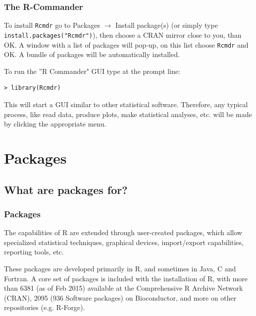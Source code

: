 \documentclass[xcolor={table},c]{beamer}
\begin{document}
\begin{frame}[fragile]\frametitle{The R-Commander}
To install \texttt{Rcmdr}  go to Packages $\rightarrow$ Install package(s) (or simply type \verb|install.packages("Rcmdr")|), then choose a CRAN mirror close to you, than OK. A window with a list of packages will pop-up, on this list choose \texttt{Rcmdr} and OK. A bundle of packages will be automatically installed.

To run the ''R Commander" GUI type at the prompt line:
\begin{verbatim}
> library(Rcmdr)
\end{verbatim}
This will start a GUI similar to other statistical software. Therefore, any typical process, like read data, produce plots, make statistical analyses, etc. will be made by clicking the appropriate menu.
\end{frame}

\section{Packages}
\subsection{What are packages for?}

\begin{frame}[shrink=5]\frametitle{Packages}
  The capabilities of R are extended through user-created packages, which allow specialized statistical techniques, graphical devices, import/export capabilities, reporting tools, etc. \newline

These packages are developed primarily in R, and sometimes in Java, C and Fortran. A core set of packages is included with the installation of R, with more than 6381 (as of Feb 2015) available at the Comprehensive R Archive Network (CRAN), 2095 (936 Software packages) on Bioconductor, and more on other repositories (e.g. R-Forge).
\begin{center}
\end{center}
\end{frame}
\end{document}
